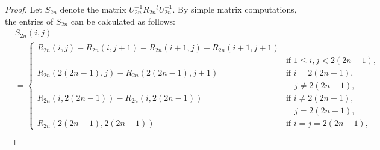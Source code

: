 \documentclass[12pt, leqno]{amsart}
\numberwithin{equation}{section}
\theoremstyle{plain}
\theoremstyle{definition}
\newcommand{\0}{\mathbf{0}}
\begin{document}
\begin{proof}
Let $S_{2n}$ denote the matrix $U_{2n}^{-1}R_{2n}{}^tU_{2n}^{-1}$.
By simple matrix computations, the entries of $S_{2n}$ can be calculated as follows: 
\small
\begin{align*}
&S_{2n}(i,j) \\
&=\begin{cases}
R_{2n}(i,j)-R_{2n}(i,j+1)-R_{2n}(i+1,j)+R_{2n}(i+1,j+1) \\
&\text{if $1\leq i,j<2(2n-1)$,}\\
R_{2n}(2(2n-1),j)-R_{2n}(2(2n-1),j+1) &\text{if $i=2(2n-1)$,}\\
 &\quad \text{$j\neq2(2n-1)$,}\\
R_{2n}(i,2(2n-1))-R_{2n}(i,2(2n-1)) &\text{if $i\neq2(2n-1)$,}\\
 &\quad \text{$j=2(2n-1)$,}\\
R_{2n}(2(2n-1),2(2n-1)) &\text{if $i=j=2(2n-1)$,} 
\end{cases}
\\

\end{align*}
\end{proof}
\end{document}

